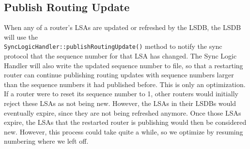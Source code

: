 \subsection{Publish Routing Update}
\label{sssec:routing-update}
When any of a router's LSAs are updated or refreshed by the LSDB, the LSDB will use the \\ \texttt{SyncLogicHandler::publishRoutingUpdate()} method to notify the sync protocol that the sequence number for that LSA has changed.
The Sync Logic Handler will also write the updated sequence number to file, so that a restarting router can continue publishing routing updates with sequence numbers larger than the sequence numbers it had published before. This is only an optimization. If a router were to reset its sequence number to 1, other routers would initially reject these LSAs as not being new. However, the LSAs in their LSDBs would eventually expire, since they are not being refreshed anymore. Once those LSAs expire, the LSAs that the restarted router is publishing would then be considered new. However, this process could take quite a while, so we optimize by resuming numbering where we left off.
